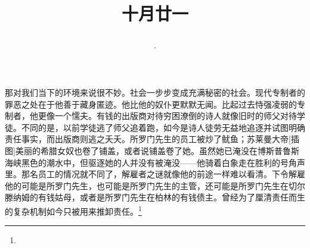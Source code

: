 \title{\date[d=21,m=11,y=2024][year:cn-y,年,month:cn,day:cn,日,·,weekday]·十月廿一 }
那对我们当下的环境来说很不妙。社会一步步变成充满秘密的社会。现代专制者的罪恶之处在于他善于藏身匿迹。他比他的奴仆更默默无闻。比起过去恃强凌弱的专制者，他更像一个懦夫。有钱的出版商对待穷困潦倒的诗人就像旧时的师父对待学徒。不同的是，以前学徒逃了师父追着跑，如今是诗人徒劳无益地追逐并试图明确责任事实，而出版商则逃之夭夭。所罗门先生的员工被炒了鱿鱼；苏莱曼大帝[插图]美丽的希腊女奴也卷了铺盖，或者说铺盖卷了她。虽然她已淹没在博斯普鲁斯海峡黑色的潮水中，但驱逐她的人并没有被淹没——他骑着白象走在胜利的号角声里。那名员工的情况就不同了，解雇者之谜就像他的前途一样难以看清。下令解雇他的可能是所罗门先生，也可能是所罗门先生的主管，还可能是所罗门先生在切尔滕纳姆的有钱姑母，或者是所罗门先生在柏林的有钱债主。曾经为了厘清责任而生的复杂机制如今只被用来推卸责任。\footnote{ }

